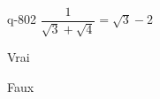\begin{truefalse}{q-802}
$\dfrac{1}{\sqrt{3}+\sqrt{4}} = \sqrt{3}-2$
\item Vrai
\item* Faux
\end{truefalse}

